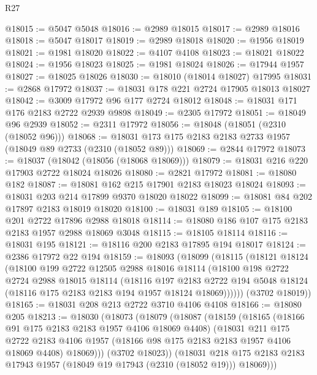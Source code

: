 \begin{lexlean}{R27}
\begin{coremodule}
@18015 := @5047 @5048
@18016 := @2989 @18015
@18017 := @2989 @18016
@18018 := @5047 @18017
@18019 := @2989 @18018
@18020 := @1956 @18019
@18021 := @1981 @18020
@18022 := @4107 @4108
@18023 := @18021 @18022
@18024 := @1956 @18023
@18025 := @1981 @18024
@18026 := @17944 @1957
@18027 := @18025 @18026
@18030 := @18010 (@18014 @18027) @17995
@18031 := @2868 @17972
@18037 := @18031 @178 @221 @2724 @17905 @18013 @18027
@18042 := @3009 @17972 @96 @177 @2724 @18012
@18048 := @18031 @171 @176 @2183 @2722 @2939 @9898
@18049 := @2305 @17972
@18051 := @18049 @96 @2939
@18052 := @2311 @17972
@18056 := @18048 (@18051 (@2310 (@18052 @96)))
@18068 := @18031 @173 @175 @2183 @2183 @2733 @1957 (@18049 @89 @2733 (@2310 (@18052 @89)))
@18069 := @2844 @17972
@18073 := @18037 (@18042 (@18056 (@18068 @18069)))
@18079 := @18031 @216 @220 @17903 @2722 @18024 @18026
@18080 := @2821 @17972
@18081 := @18080 @182
@18087 := @18081 @162 @215 @17901 @2183 @18023 @18024
@18093 := @18031 @203 @214 @17899 @9370 @18020 @18022
@18099 := @18081 @84 @202 @17897 @2183 @18019 @18020
@18100 := @18031 @189
@18105 := @18100 @201 @2722 @17896 @2988 @18018
@18114 := @18080 @186 @107 @175 @2183 @2183 @1957 @2988 @18069 @3048
@18115 := @18105 @18114
@18116 := @18031 @195
@18121 := @18116 @200 @2183 @17895 @194 @18017
@18124 := @2386 @17972 @22 @194
@18159 := @18093
    (@18099
      (@18115
        (@18121
          @18124
          (@18100
            @199
            @2722
            @12505
            @2988
            @18016
            @18114
            (@18100
              @198
              @2722
              @2724
              @2988
              @18015
              @18114
              (@18116
                @197
                @2183
                @2722
                @194
                @5048
                @18124
                (@18116 @175 @2183 @2183 @194 @1957 @18124 @18069))))))
      (@3702 @18019))
@18165 := @18031 @208 @213 @2722 @3710 @4106 @4108
@18166 := @18080 @205
@18213 := @18030
    (@18073
      (@18079
        (@18087
          (@18159
            (@18165
              (@18166 @91 @175 @2183 @2183 @1957 @4106 @18069 @4408)
              (@18031
                @211
                @175
                @2722
                @2183
                @4106
                @1957
                (@18166 @98 @175 @2183 @2183 @1957 @4106 @18069 @4408)
                @18069)))
          (@3702 @18023))
        (@18031
          @218
          @175
          @2183
          @2183
          @17943
          @1957
          (@18049 @19 @17943 (@2310 (@18052 @19)))
          @18069)))

\end{coremodule}
\end{lexlean}

